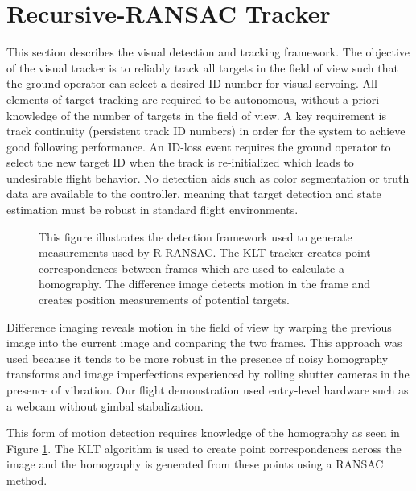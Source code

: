 \section{Recursive-RANSAC Tracker}
This section describes the visual detection and tracking framework. The objective of the visual tracker is to reliably track all targets in the field of view such that the ground operator can select a desired ID number for visual servoing. All elements of target tracking are required to be autonomous, without a priori knowledge of the number of targets in the field of view. A key requirement is track continuity (persistent track ID numbers) in order for the system to achieve good following performance. An ID-loss event requires the ground operator to select the new target ID when the track is re-initialized which leads to undesirable flight behavior. No detection aids such as color segmentation or truth data are available to the controller, meaning that target detection and state estimation must be robust in standard flight environments.
\begin{figure}[htbp]
	\centering
	\caption{This figure illustrates the detection framework used to generate measurements used by R-RANSAC. The KLT tracker creates point correspondences between frames which are used to calculate a homography. The difference image detects motion in the frame and creates position measurements of potential targets.}
	\label{visual_tracking}
\end{figure}

Difference imaging reveals motion in the field of view by warping the previous image into the current image and comparing the two frames. This approach was used because it tends to be more robust in the presence of noisy homography transforms and image imperfections experienced by rolling shutter cameras in the presence of vibration. Our flight demonstration used entry-level hardware such as a webcam without gimbal stabalization.

This form of motion detection requires knowledge of the homography as seen in Figure \ref{visual_tracking}. The KLT algorithm is used to create point correspondences across the image and the homography is generated from these points using a RANSAC method.

